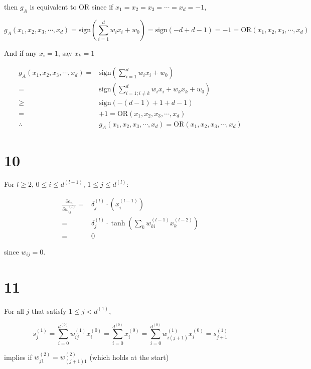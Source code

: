 \documentclass[fleqn,a4paper,12pt]{article}
\begin{document}
then $g_A$ is equivalent to OR since if $x_1 = x_2 = x_3 = \cdots = x_d = -1$,

\begin{equation*}
  g_A(x_1, x_2, x_3, \cdots, x_d) = \mathrm{sign}(\sum_{i=1}^d w_i x_i + w_0) = \mathrm{sign}(-d + d - 1) = -1 = \mathrm{OR}(x_1, x_2, x_3, \cdots, x_d)
\end{equation*}

And if any $x_i = 1$, say $x_k = 1$

\begin{align*}
  g_A(x_1, x_2, x_3, \cdots, x_d)
  =& \mathrm{sign}(\sum_{i=1}^d w_i x_i + w_0) \\
  =& \mathrm{sign}(\sum_{i=1; i \ne k}^d w_i x_i + w_k x_k + w_0) \\
  \geq& \mathrm{sign}(-(d - 1) + 1 + d - 1) \\
  =& +1 = \mathrm{OR}(x_1, x_2, x_3, \cdots, x_d) \\
  \therefore& g_A(x_1, x_2, x_3, \cdots, x_d) = \mathrm{OR}(x_1, x_2, x_3, \cdots, x_d)
\end{align*}


\section*{10}

For $l \geq 2$, $0 \leq i \leq d^{(l - 1)}$, $1 \leq j \leq d^{(l)}$:

\begin{align*}
  \frac{\partial e_n}{\partial w_{ij}^{(l)}}
  =& \delta^{(l)}_j \cdot (x_{i}^{(l - 1)})  \\
  =& \delta^{(l)}_j \cdot \tanh(\sum_k w_{ki}^{(l-1)} x_k^{(l - 2)}) \\
  =& 0
\end{align*}

since $w_{ij} = 0$.


\section*{11}

For all $j$ that satisfy $1 \leq j < d^{(1)}$,


\begin{equation*}
    s^{(1)}_j
    = \sum_{i=0}^{d^{(0)}} w_{ij}^{(1)} x_i^{(0)}
    = \sum_{i=0}^{d^{(0)}}  x_i^{(0)}
    = \sum_{i=0}^{d^{(0)}} w_{i(j + 1)}^{(1)} x_i^{(0)}
    = s^{(1)}_{j+1} 
\end{equation*}

implies if $w_{j1}^{(2)} = w_{(j + 1)1}^{(2)}$ (which holds at the start)
\end{document}
